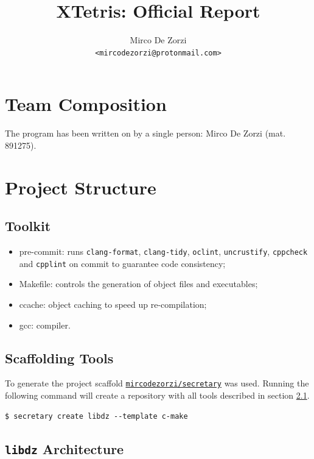 \documentclass{report}
\title{XTetris: Official Report}
\author{Mirco De Zorzi \\ \texttt{<mircodezorzi@protonmail.com>}}
\date{}
\begin{document}
\maketitle

\section{Team Composition}

The program has been written on by a single person: Mirco De Zorzi (mat. 891275).

\section{Project Structure}

\subsection{Toolkit}
\label{ssec:toolchain}

\begin{itemize}
  \item pre-commit: runs \texttt{clang-format}, \texttt{clang-tidy}, \texttt{oclint}, \texttt{uncrustify}, \texttt{cppcheck} and \texttt{cpplint} on commit to guarantee code consistency;
  \item Makefile: controls the generation of object files and executables;
  \item ccache: object caching to speed up re-compilation;
  \item gcc: compiler.
\end{itemize}

\subsection{Scaffolding Tools}

To generate the project scaffold \href{https://github.com/mircodezorzi/secretary}{\texttt{mircodezorzi/secretary}} was used. Running the following command will create a repository with all tools described in section \ref{ssec:toolchain}.

\begin{verbatim}
$ secretary create libdz --template c-make
\end{verbatim}

\subsection{\texttt{libdz} Architecture}
\end{document}
